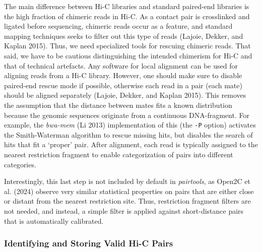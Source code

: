 \documentclass[
  11pt,
  a4paper,
]{scrbook}
\begin{document}
The main difference between Hi-C libraries and standard paired-end
libraries is the high fraction of chimeric reads in Hi-C. As a contact
pair is crosslinked and ligated before sequencing, chimeric reads occur
as a feature, and standard mapping techniques seeks to filter out this
type of reads (Lajoie, Dekker, and Kaplan 2015). Thus, we need
specialized tools for rescuing chimeric reads. That said, we have to be
cautious distinguishing the intended chimerism for Hi-C and that of
technical artefacts. Any software for local alignment can be used for
aligning reads from a Hi-C library. However, one should make sure to
disable paired-end rescue mode if possible, otherwise each read in a
pair (each mate) should be aligned separately (Lajoie, Dekker, and
Kaplan 2015). This removes the assumption that the distance between
mates fits a known distribution because the genomic sequences originate
from a continuous DNA-fragment. For example, the \emph{bwa-mem} (Li
2013) implementation of this (the \texttt{-P} option) activates the
Smith-Waterman algorithm to rescue missing hits, but disables the search
of hits that fit a `proper' pair. After alignment, each read is
typically assigned to the nearest restriction fragment to enable
categorization of pairs into different categories.

Interestingly, this last step is not included by default in
\emph{pairtools}, as Open2C et al. (2024) observe very similar
statistical properties on pairs that are either close or distant from
the nearest restriction site. Thus, restriction fragment filters are not
needed, and instead, a simple filter is applied against short-distance
pairs that is automatically calibrated.

\subsubsection{Identifying and Storing Valid Hi-C
Pairs}\label{identifying-and-storing-valid-hi-c-pairs}
\end{document}
